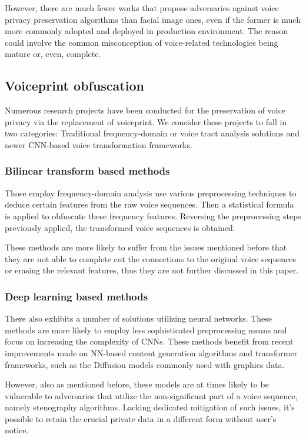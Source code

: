 \documentclass[journal]{IEEEtran} %
\begin{document}
However, there are much fewer works that propose adversaries against voice privacy preservation algorithms than facial image ones, even if the former is much more commonly adopted and deployed in production environment. The reason could involve the common misconception of voice-related technologies being mature or, even, complete.

\subsection{Voiceprint obfuscation}

Numerous research projects have been conducted for the preservation of voice privacy via the replacement of voiceprint. We consider these projects to fall in two categories: Traditional frequency-domain or voice tract analysis solutions and newer CNN-based voice transformation frameworks.

\subsubsection{Bilinear transform based methods}

Those employ frequency-domain analysis use various preprocessing techniques to deduce certain features from the raw voice sequences. Then a statistical formula is applied to obfuscate these frequency features. Reversing the preprocessing steps previously applied, the transformed voice sequences is obtained.\cite{a9, a10, a11}

These methods are more likely to suffer from the issues mentioned before that they are not able to complete cut the connections to the original voice sequences or erasing the relevant features, thus they are not further discussed in this paper.

\subsubsection{Deep learning based methods}

There also exhibits a number of solutions utilizing neural networks. These methods are more likely to employ less sophisticated preprocessing means and focus on increasing the complexity of CNNs. These methods benefit from recent improvements made on NN-based content generation algorithms and transformer frameworks, such as the Diffusion models commonly used with graphics data.\cite{a8}

However, also as mentioned before, these models are at times likely to be vulnerable to adversaries that utilize the non-significant part of a voice sequence, namely stenography algorithms. Lacking dedicated mitigation of such issues, it's possible to retain the crucial private data in a different form without user's notice.
\end{document}
